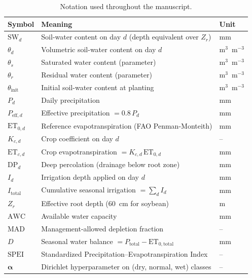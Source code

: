 \documentclass[review,5p,times]{elsarticle}
\begin{document}
\begin{table}[!t]
\centering
\caption{Notation used throughout the manuscript.}
\label{tab:notation}
\small
\begin{tabular}{lll}
\toprule
Symbol & Meaning & Unit \\
\midrule
$\mathrm{SW}_d$        & Soil-water content on day $d$ (depth equivalent over $Z_r$) & mm \\
$\theta_d$             & Volumetric soil-water content on day $d$         & m$^{3}$~m$^{-3}$ \\
$\theta_s$             & Saturated water content (parameter)             & m$^{3}$~m$^{-3}$ \\
$\theta_r$             & Residual water content (parameter)              & m$^{3}$~m$^{-3}$ \\
$\theta_{\mathrm{init}}$ & Initial soil-water content at planting        & m$^{3}$~m$^{-3}$ \\
$P_d$                  & Daily precipitation                              & mm \\
$P_{\mathrm{eff},d}$   & Effective precipitation $= 0.8\,P_d$             & mm \\
$\mathrm{ET}_{0,d}$    & Reference evapotranspiration (FAO Penman-Monteith) & mm \\
$K_{c,d}$              & Crop coefficient on day $d$                      & -- \\
$\mathrm{ET}_{c,d}$    & Crop evapotranspiration $= K_{c,d}\,\mathrm{ET}_{0,d}$ & mm \\
$\mathrm{DP}_d$        & Deep percolation (drainage below root zone)      & mm \\
$I_d$                  & Irrigation depth applied on day $d$              & mm \\
$I_{\mathrm{total}}$   & Cumulative seasonal irrigation $= \sum_d I_d$    & mm \\
$Z_r$                  & Effective root depth (60~cm for soybean)         & m \\
$\mathrm{AWC}$         & Available water capacity                         & mm \\
$\mathrm{MAD}$         & Management-allowed depletion fraction            & -- \\
$D$                    & Seasonal water balance $= P_{\mathrm{total}} - \mathrm{ET}_{0,\mathrm{total}}$ & mm \\
$\mathrm{SPEI}$        & Standardized Precipitation--Evapotranspiration Index & -- \\
$\boldsymbol{\alpha}$  & Dirichlet hyperparameter on (dry, normal, wet) classes & -- \\
\bottomrule
\end{tabular}
\end{table}
\end{document}
